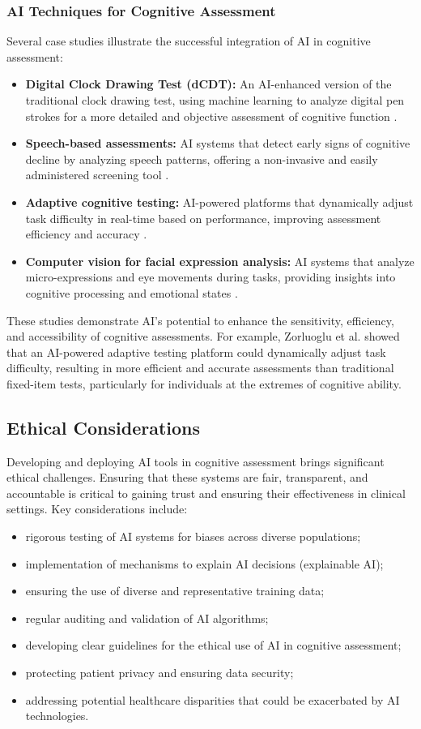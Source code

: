 \subsubsection{AI Techniques for Cognitive Assessment}
Several case studies illustrate the successful integration of AI in cognitive assessment:
\begin{itemize}
\item \textbf{Digital Clock Drawing Test (dCDT):} An AI-enhanced version of the traditional clock drawing test, using machine learning to analyze digital pen strokes for a more detailed and objective assessment of cognitive function \cite{Davis2017}.
\item \textbf{Speech-based assessments:} AI systems that detect early signs of cognitive decline by analyzing speech patterns, offering a non-invasive and easily administered screening tool \cite{Fraser2019}.
\item \textbf{Adaptive cognitive testing:} AI-powered platforms that dynamically adjust task difficulty in real-time based on performance, improving assessment efficiency and accuracy \cite{Zorluoglu2020}.
\item \textbf{Computer vision for facial expression analysis:} AI systems that analyze micro-expressions and eye movements during tasks, providing insights into cognitive processing and emotional states \cite{Bandara2018}.
\end{itemize}

These studies demonstrate AI's potential to enhance the sensitivity, efficiency, and accessibility of cognitive assessments. For example, Zorluoglu et al. \cite{Zorluoglu2020} showed that an AI-powered adaptive testing platform could dynamically adjust task difficulty, resulting in more efficient and accurate assessments than traditional fixed-item tests, particularly for individuals at the extremes of cognitive ability.

\subsection{Ethical Considerations}
Developing and deploying AI tools in cognitive assessment brings significant ethical challenges. Ensuring that these systems are fair, transparent, and accountable is critical to gaining trust and ensuring their effectiveness in clinical settings. Key considerations include:
\begin{itemize}
\item rigorous testing of AI systems for biases across diverse populations;
\item implementation of mechanisms to explain AI decisions (explainable AI);
\item ensuring the use of diverse and representative training data;
\item regular auditing and validation of AI algorithms;
\item developing clear guidelines for the ethical use of AI in cognitive assessment;
\item protecting patient privacy and ensuring data security;
\item addressing potential healthcare disparities that could be exacerbated by AI technologies.
\end{itemize}


